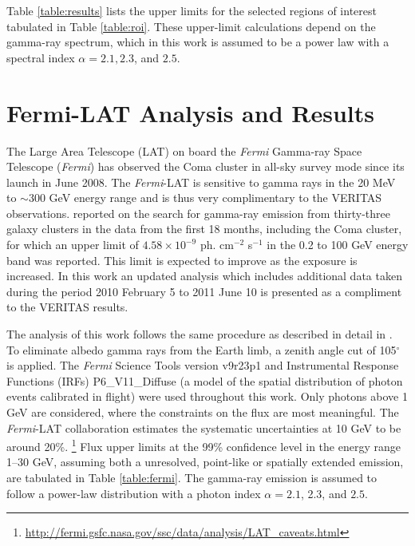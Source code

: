 \documentclass[12pt,manuscript]{aastex}
\begin{document}
Table \ref{table:results} lists the upper limits for the selected regions of interest tabulated in
Table \ref{table:roi}. These upper-limit calculations depend on the gamma-ray spectrum, which in
this work is assumed to be a power law with a spectral index $\alpha=2.1, 2.3$, and $2.5$.

%
%

\section{Fermi-LAT Analysis and Results}
The Large Area Telescope (LAT) on board the \emph{Fermi} Gamma-ray Space Telescope (\emph{Fermi})
has observed the Coma cluster in all-sky survey mode since its launch in June 2008. The
\emph{Fermi}-LAT is sensitive to gamma rays in the 20 MeV to $\sim$300 GeV energy range and is thus
very complimentary to the VERITAS observations. \citet{article:Ackermann_etal:2010} reported on the
search for gamma-ray emission from thirty-three galaxy clusters in the data from the first 18
months, including the Coma cluster, for which an upper limit of $4.58\times 10^{-9}$ ph. cm$^{-2}$
s$^{-1}$ in the 0.2 to 100 GeV energy band was reported. This limit is expected to improve as the
exposure is increased. In this work an updated analysis which includes additional data taken during
the period 2010 February 5 to 2011 June 10 is presented as a compliment to the VERITAS results.

The analysis of this work follows the same procedure as described in detail in
\citet{article:Abdo_etal:2009}. To eliminate albedo gamma rays from the Earth limb, a zenith angle
cut of 105$^{\circ}$ is applied. The \emph{Fermi} Science Tools version v9r23p1 and Instrumental
Response Functions (IRFs) P6\_V11\_Diffuse (a model of the spatial distribution of photon events
calibrated  in flight) were used throughout this work. Only photons above 1 GeV are considered,
where the constraints on the flux are most meaningful. The \emph{Fermi}-LAT collaboration estimates
the systematic uncertainties at 10 GeV to be around 20\%.
\footnote{\url{http://fermi.gsfc.nasa.gov/ssc/data/analysis/LAT\_caveats.html}} Flux upper limits
at the 99\% confidence level in the energy range 1--30 GeV, assuming both a unresolved, point-like
or spatially extended emission, are tabulated in Table \ref{table:fermi}. The gamma-ray emission is
assumed to follow a power-law distribution with a photon index $\alpha=2.1$, 2.3, and $2.5$.

%
%
\end{document}
